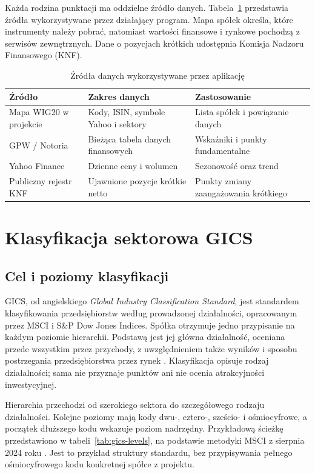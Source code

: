 \documentclass[12pt,a4paper,twoside]{report}
\begin{document}
Każda rodzina punktacji ma oddzielne źródło danych. Tabela~\ref{tab:sources} przedstawia źródła wykorzystywane przez działający program. Mapa spółek określa, które instrumenty należy pobrać, natomiast wartości finansowe i rynkowe pochodzą z serwisów zewnętrznych. Dane o pozycjach krótkich udostępnia Komisja Nadzoru Finansowego (KNF).

\begin{table}[htbp]
\centering
\caption{Źródła danych wykorzystywane przez aplikację}
\label{tab:sources}
\small
\begin{tabularx}{\textwidth}{p{3cm}XX}
\toprule
Źródło & Zakres danych & Zastosowanie \\
\midrule
Mapa WIG20 w projekcie & Kody, ISIN, symbole Yahoo i sektory & Lista spółek i powiązanie danych \\
GPW / Notoria & Bieżąca tabela danych finansowych & Wskaźniki i punkty fundamentalne \\
Yahoo Finance & Dzienne ceny i wolumen & Sezonowość oraz trend \\
Publiczny rejestr KNF & Ujawnione pozycje krótkie netto & Punkty zmiany zaangażowania krótkiego \\
\bottomrule
\end{tabularx}
\end{table}

\section{Klasyfikacja sektorowa GICS}
\label{sec:gics}

\subsection{Cel i poziomy klasyfikacji}

GICS, od angielskiego \textit{Global Industry Classification Standard}, jest standardem klasyfikowania przedsiębiorstw według prowadzonej działalności, opracowanym przez MSCI i S\&P Dow Jones Indices. Spółka otrzymuje jedno przypisanie na każdym poziomie hierarchii. Podstawą jest jej główna działalność, oceniana przede wszystkim przez przychody, z uwzględnieniem także wyników i sposobu postrzegania przedsiębiorstwa przez rynek \cite{gics}. Klasyfikacja opisuje rodzaj działalności; sama nie przyznaje punktów ani nie ocenia atrakcyjności inwestycyjnej.

Hierarchia przechodzi od szerokiego sektora do szczegółowego rodzaju działalności. Kolejne poziomy mają kody dwu-, cztero-, sześcio- i ośmiocyfrowe, a początek dłuższego kodu wskazuje poziom nadrzędny. Przykładową ścieżkę przedstawiono w tabeli~\ref{tab:gics-levels}, na podstawie metodyki MSCI z sierpnia 2024 roku \cite{gicsmethodology}. Jest to przykład struktury standardu, bez przypisywania pełnego ośmiocyfrowego kodu konkretnej spółce z projektu.
\end{document}
